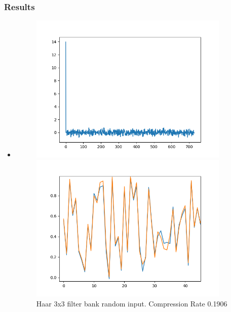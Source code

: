 \documentclass{beamer}
\begin{document}
\begin{frame}
    \frametitle{Results}
    \begin{itemize}
        \item
              \begin{figure}[ht!]
                  \centering
                  \begin{minipage}{0.45\textwidth}
                      \centering
                      \includegraphics[width=0.9\textwidth]{fig/Haar3Augmented1D_freq.png} %
                      \caption{Haar 3x3 filter bank random input. Compression Rate 0.1906}
                      \label{fig:Haar3}
                  \end{minipage}\hfill
                  \begin{minipage}{0.45\textwidth}
                      \centering
                      \includegraphics[width=0.9\textwidth]{fig/Haar3Augmented1D_rec.png} %

\end{minipage}
\end{figure}
\end{itemize}
\end{frame}
\end{document}
